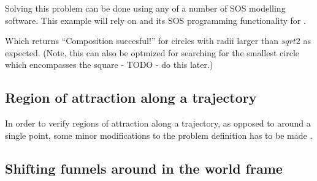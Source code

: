 Solving this problem can be done using any of a number of \ac{SOS} modelling
software. This example will rely on \cite[Yalmip]{Lofberg2004} and its \ac{SOS}
programming functionality \cite{Lofberg2009} for \matlab.




Which returns ``Composition succesful!'' for circles with radii larger than
\(sqrt{2}\) as expected. (Note, this can also be optmized for searching for the
smallest circle which encompasses the square - TODO - do this later.)

\subsection{Region of attraction along a trajectory}

In order to verify regions of attraction along a trajectory, as opposed to
around a single point, some minor modifications to the problem definition has to
be made \cite[see Tedrake et al]{tedrakesomeyear}.

\subsection{Shifting funnels around in the world frame}

